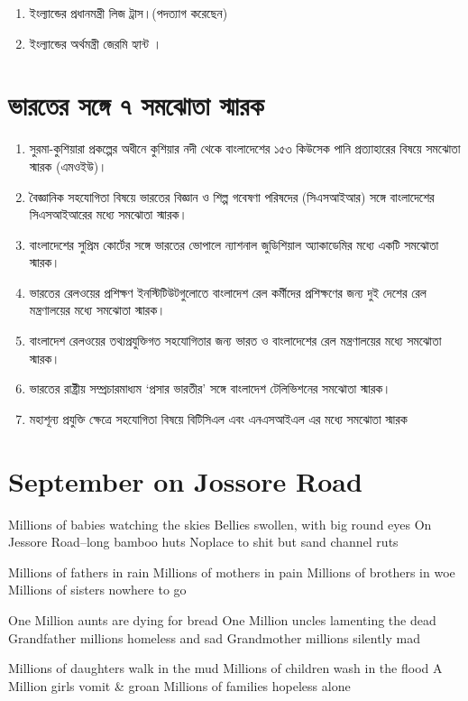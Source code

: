 \documentclass[11pt]{article}
\begin{document}
\begin{enumerate}
\item ইংল্যান্ডের প্রধানমন্ত্রী লিজ ট্রাস।(পদত্যাগ করেছেন)
\item ইংল্যান্ডের অর্থমন্ত্রী জেরমি হ্যান্ট ।
\end{enumerate}

\section{ভারতের সঙ্গে ৭ সমঝোতা স্মারক}
\label{sec:org285da40}
\begin{enumerate}
\item সুরমা-কুশিয়ারা প্রকল্পের অধীনে কুশিয়ার নদী থেকে বাংলাদেশের ১৫৩ কিউসেক পানি প্রত্যাহারের বিষয়ে সমঝোতা
স্মারক (এমওইউ)।
\item বৈজ্ঞানিক সহযোগিতা বিষয়ে ভারতের বিজ্ঞান ও শিল্প গবেষণা পরিষদের (সিএসআইআর) সঙ্গে বাংলাদেশের
সিএসআইআরের মধ্যে সমঝোতা স্মারক।
\item বাংলাদেশের সুপ্রিম কোর্টের সঙ্গে ভারতের ভোপালে ন্যাশনাল জুডিশিয়াল অ্যাকাডেমির মধ্যে একটি সমঝোতা স্মারক।
\item ভারতের রেলওয়ের প্রশিক্ষণ ইনস্টিটিউটগুলোতে বাংলাদেশ রেল কর্মীদের প্রশিক্ষণের জন্য
দুই দেশের রেল মন্ত্রণালয়ের মধ্যে সমঝোতা স্মারক।
\item বাংলাদেশ রেলওয়ের তথ্যপ্রযুক্তিগত সহযোগিতার জন্য ভারত ও বাংলাদেশের রেল মন্ত্রণালয়ের মধ্যে সমঝোতা স্মারক।
\item ভারতের রাষ্ট্রীয় সম্প্রচারমাধ্যম ‘প্রসার ভারতীর’ সঙ্গে বাংলাদেশ টেলিভিশনের সমঝোতা স্মারক।
\item মহাশূন্য প্রযুক্তি ক্ষেত্রে সহযোগিতা বিষয়ে বিটিসিএল এবং এনএসআইএল এর মধ্যে সমঝোতা স্মারক
\end{enumerate}

\section{September on Jossore Road}
\label{sec:orgde64edb}

Millions of babies watching the skies
Bellies swollen, with big round eyes
On Jessore Road--long bamboo huts
Noplace to shit but sand channel ruts

Millions of fathers in rain
Millions of mothers in pain
Millions of brothers in woe
Millions of sisters nowhere to go

One Million aunts are dying for bread
One Million uncles lamenting the dead
Grandfather millions homeless and sad
Grandmother millions silently mad

Millions of daughters walk in the mud
Millions of children wash in the flood
A Million girls vomit \& groan
Millions of families hopeless alone
\end{document}
